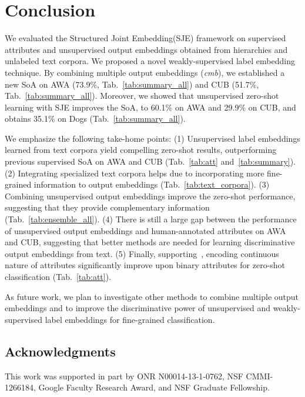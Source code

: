 \documentclass[10pt,twocolumn,letterpaper]{article}
\newcommand{\SJElong}{Structured Joint Embedding\xspace}
\newcommand{\SJE}{SJE\xspace}
\begin{document}
\section{Conclusion}
\label{sec:conclusion}
We evaluated the \SJElong (SJE) framework on supervised attributes and unsupervised output embeddings obtained from hierarchies and unlabeled text corpora. We proposed a novel weakly-supervised label embedding technique. 
By combining multiple output embeddings (\emph {cmb}), we established a new SoA on AWA (73.9\%, Tab.~\ref{tab:summary_all}) and CUB (51.7\%, Tab.~\ref{tab:summary_all}).
Moreover, we showed that unsupervised zero-shot learning with \SJE improves the SoA, to 60.1\% on AWA and 29.9\% on CUB, and obtains 35.1\% on Dogs (Tab.~\ref{tab:summary_all}). 

We emphasize the following take-home points: (1) Unsupervised label embeddings learned from text corpora yield compelling zero-shot results, outperforming previous supervised SoA on AWA and CUB (Tab.~\ref{tab:att} and~\ref{tab:summary}).
(2) Integrating specialized text corpora helps due to incorporating more fine-grained information to output embeddings (Tab.~\ref{tab:text_corpora}).
(3) Combining unsupervised output embeddings improve the zero-shot performance, suggesting that they provide complementary information (Tab.~\ref{tab:ensemble_all}).
(4) There is still a large gap between the performance of unsupervised output embeddings and human-annotated attributes on AWA and CUB, suggesting that better methods are needed for learning discriminative output embeddings from text. (5) Finally, supporting~\cite{APHS15, RSSS12}, encoding continuous nature of attributes significantly improve upon binary attributes for zero-shot classification (Tab.~\ref{tab:att}).


As future work, we plan to investigate other methods to combine multiple output embeddings and to improve the discriminative power of unsupervised and weakly-supervised label embeddings for fine-grained classification.

\subsection*{Acknowledgments}
\vspace*{-0.05in}
This work was supported in part by ONR N00014-13-1-0762, NSF CMMI-1266184, Google Faculty Research Award, and NSF Graduate Fellowship.


{\small


}
\end{document}

